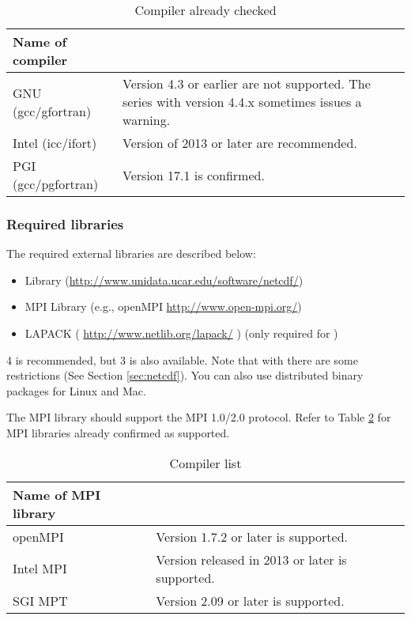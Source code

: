 \begin{table}[tb]
\begin{center}
\caption{Compiler already checked}
\begin{tabularx}{150mm}{|l|X|} \hline
 \rowcolor[gray]{0.9} Name of compiler &  \\ \hline
  GNU (gcc/gfortran)    & Version 4.3 or earlier are not supported. The series with version 4.4.x sometimes issues a warning. \\ \hline
  Intel (icc/ifort)     & Version of 2013 or later are recommended. \\ \hline
  PGI (gcc/pgfortran)   & Version 17.1 is confirmed.       \\ \hline
\end{tabularx}
\label{tab:compatible_compiler}
\end{center}
\end{table}



\subsubsection{Required libraries}\label{sec:inst_env}

The required external libraries are described below:
\begin{itemize}
\item {\netcdf} Library (\url{http://www.unidata.ucar.edu/software/netcdf/})
\item MPI Library (e.g., openMPI \url{http://www.open-mpi.org/})
\item LAPACK ( \url{http://www.netlib.org/lapack/} ) (only required for \scalegm)
\end{itemize}

{\netcdf}4 is recommended, but {\netcdf}3 is also available.
Note that with  there are some restrictions (See Section \ref{sec:netcdf}).
You can also use distributed binary packages for Linux and Mac.

The MPI library should support the MPI 1.0/2.0 protocol.  Refer to Table \ref{tab:compatible_mpi} for MPI libraries already confirmed as supported.

\begin{table}[tb]
\begin{center}
\caption{Compiler list}
\begin{tabularx}{150mm}{|l|X|} \hline
 \rowcolor[gray]{0.9} Name of MPI library &  \\ \hline
  openMPI               & Version 1.7.2 or later is supported. \\ \hline
  Intel MPI             & Version released in 2013 or later is supported.\\ \hline
  SGI MPT               & Version 2.09 or later is supported. \\ \hline
\end{tabularx}
\label{tab:compatible_mpi}
\end{center}
\end{table}


